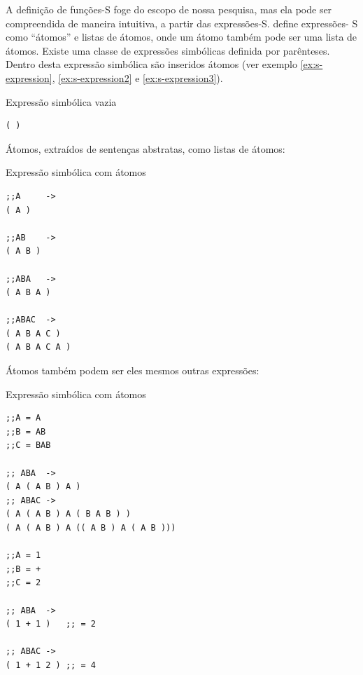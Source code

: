 A definição de funções-S foge do escopo de nossa pesquisa, mas ela pode ser compreendida de maneira intuitiva, a partir das expressões-S.  define expressões- S como ``átomos'' e listas de átomos, onde um átomo também pode ser uma lista de átomos. Existe uma classe de expressões simbólicas definida por parênteses. Dentro desta expressão simbólica são inseridos átomos (ver exemplo \ref{ex:s-expression}, \ref{ex:s-expression2} e \ref{ex:s-expression3}). 

\begin{example}{Expressão simbólica vazia}\label{ex:s-expression}
\begin{verbatim}
( )
\end{verbatim}
\end{example}

Átomos, extraídos de sentenças abstratas, como listas de átomos:

\begin{example}{Expressão simbólica com átomos}\label{ex:s-expression2}
\begin{verbatim}
;;A     -> 
( A )

;;AB    -> 
( A B )

;;ABA   ->
( A B A )

;;ABAC  ->
( A B A C )
( A B A C A )
\end{verbatim}
\end{example}

Átomos também podem ser eles mesmos outras expressões:

\begin{example}{Expressão simbólica com átomos}\label{ex:s-expression3}
\begin{verbatim}
;;A = A
;;B = AB
;;C = BAB

;; ABA  -> 
( A ( A B ) A )
;; ABAC ->
( A ( A B ) A ( B A B ) )
( A ( A B ) A (( A B ) A ( A B )))

;;A = 1
;;B = +
;;C = 2

;; ABA  -> 
( 1 + 1 )   ;; = 2

;; ABAC -> 
( 1 + 1 2 ) ;; = 4
\end{verbatim}
\end{example}

